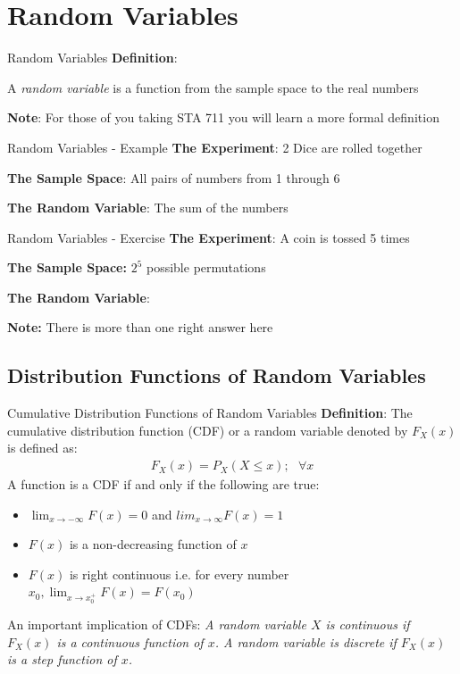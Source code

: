 \documentclass{beamer}
\begin{document}
\section{Random Variables}

\begin{frame}{Random Variables}
\textbf{Definition}:
\newline

\begin{center}
A \emph{random variable} is a function from the sample space to the real numbers 
\end{center}
\textbf{Note}: For those of you taking STA 711 you will learn a more formal definition
\end{frame}

\begin{frame}{Random Variables - Example}
\textbf{The Experiment}:
2 Dice are rolled together

\textbf{The Sample Space}:
All pairs of numbers from 1 through 6

\textbf{The Random Variable}:
The sum of the numbers 
\end{frame}

\begin{frame}{Random Variables - Exercise}
\textbf{The Experiment}:
A coin is tossed 5 times


\textbf{The Sample Space:}
$2^{5}$ possible permutations


\textbf{The Random Variable}:


\textbf{Note:} There is more than one right answer here
\end{frame}

\subsection{Distribution Functions of Random Variables}
\begin{frame}{Cumulative Distribution Functions of Random Variables}
\textbf{Definition}:
The cumulative distribution function (CDF) or a random variable denoted by $F_{X}(x)$ is defined as:
\begin{align*}
F_{X}(x) = P_{X}(X \leq x);\>\>\> \forall x
\end{align*}
A function is a CDF if and only if the following are true:
\begin{itemize}
\item{$\lim_{x \rightarrow -\infty}F(x) = 0$ and $lim_{x \rightarrow \infty}F(x) = 1$}
\item{$F(x)$ is a non-decreasing function of $x$}
\item{$F(x)$ is right continuous i.e. for every number $x_{0}, \lim_{x\rightarrow x_{0}^{+}} F(x) = F(x_{0})$} 
\end{itemize}
An important implication of CDFs: \textit{A random variable $X$ is continuous if $F_{X}(x)$ is a continuous function of $x$. A random variable is discrete if $F_{X}(x)$ is a step function of $x$. }
\end{frame}
\end{document}
